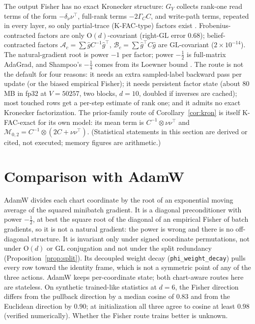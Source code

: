 \documentclass[11pt]{article}
\theoremstyle{definition}
\theoremstyle{remark}
\newcommand{\GL}{\mathrm{GL}}
\begin{document}
The output Fisher has no exact Kronecker structure: $G_Y$ collects rank-one read terms of the form $-\delta_\nu\nu^\top$, full-rank terms $-2\Gamma_CC$, and write-path terms, repeated in every layer, so only partial-trace (K-FAC-type) factors exist \cite{MartensGrosse2015}. Frobenius-contracted factors are only $\mathrm{O}(d)$-covariant (right-$\GL$ error $0.68$); belief-contracted factors $\mathcal{A}_c=\sum\hat gC^{-1}\hat g^\top$, $\mathcal{B}_c=\sum\hat g^\top C\hat g$ are $\GL$-covariant ($2\times10^{-14}$). The natural-gradient root is power $-1$ per factor; power $-\frac12$ is full-matrix AdaGrad, and Shampoo's $-\frac14$ comes from its Loewner bound \cite{GuptaKorenSinger2018}. The route is not the default for four reasons: it needs an extra sampled-label backward pass per update (or the biased empirical Fisher); it needs persistent factor state (about $80$ MB in fp32 at $V=50257$, two blocks, $d=10$, doubled if inverses are cached); most touched rows get a per-step estimate of rank one; and it admits no exact Kronecker factorization. The prior-family route of Corollary~\ref{cor:kron} is itself K-FAC-exact for its own model: its mean term is $C^{-1}\otimes\nu\nu^\top$ and $\mathcal{M}_{0,2}=C^{-1}\otimes(2C+\nu\nu^\top)$. (Statistical statements in this section are derived or cited, not executed; memory figures are arithmetic.)

\section{Comparison with AdamW}\label{sec:adamw}

AdamW \cite{KingmaBa2015,LoshchilovHutter2019} divides each chart coordinate by the root of an exponential moving average of the squared minibatch gradient. It is a diagonal preconditioner with power $-\frac12$, at best the square root of the diagonal of an empirical Fisher of batch gradients, so it is not a natural gradient: the power is wrong and there is no off-diagonal structure. It is invariant only under signed coordinate permutations, not under $\mathrm{O}(d)$ or $\GL$ conjugation and not under the split redundancy (Proposition~\ref{prop:split}). Its decoupled weight decay (\texttt{phi\_weight\_decay}) pulls every row toward the identity frame, which is not a symmetric point of any of the three actions. AdamW keeps per-coordinate state; both chart-aware routes here are stateless. On synthetic trained-like statistics at $d=6$, the Fisher direction differs from the pullback direction by a median cosine of $0.83$ and from the Euclidean direction by $0.90$; at initialization all three agree to cosine at least $0.98$ (verified numerically). Whether the Fisher route trains better is unknown.
\end{document}
